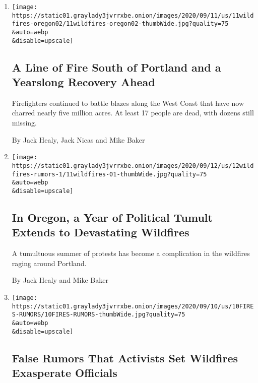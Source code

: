 \begin{enumerate}
\def\labelenumi{\arabic{enumi}.}
\item
  \href{/2020/09/11/us/fires-oregon-california-washington.html}{}

  \texttt{[image: https://static01.graylady3jvrrxbe.onion/images/2020/09/11/us/11wildfires-oregon02/11wildfires-oregon02-thumbWide.jpg?quality=75\\\&auto=webp\\\&disable=upscale]}

  \hypertarget{a-line-of-fire-south-of-portland-and-a-yearslong-recovery-ahead}{%
  \subsection{A Line of Fire South of Portland and a Yearslong Recovery
  Ahead}\label{a-line-of-fire-south-of-portland-and-a-yearslong-recovery-ahead}}

  Firefighters continued to battle blazes along the West Coast that have
  now charred nearly five million acres. At least 17 people are dead,
  with dozens still missing.

  By Jack Healy, Jack Nicas and Mike Baker
\item
  \href{/2020/09/11/us/fires-oregon-antifa-rumors.html}{}

  \texttt{[image: https://static01.graylady3jvrrxbe.onion/images/2020/09/12/us/12wildfires-rumors-1/11wildfires-01-thumbWide.jpg?quality=75\\\&auto=webp\\\&disable=upscale]}

  \hypertarget{in-oregon-a-year-of-political-tumult-extends-to-devastating-wildfires}{%
  \subsection{In Oregon, a Year of Political Tumult Extends to
  Devastating
  Wildfires}\label{in-oregon-a-year-of-political-tumult-extends-to-devastating-wildfires}}

  A tumultuous summer of protests has become a complication in the
  wildfires raging around Portland.

  By Jack Healy and Mike Baker
\item
  \href{/2020/09/10/us/antifa-wildfires.html}{}

  \texttt{[image: https://static01.graylady3jvrrxbe.onion/images/2020/09/10/us/10FIRES-RUMORS/10FIRES-RUMORS-thumbWide.jpg?quality=75\\\&auto=webp\\\&disable=upscale]}

  \hypertarget{false-rumors-that-activists-set-wildfires-exasperate-officials}{%
  \subsection{False Rumors That Activists Set Wildfires Exasperate
  Officials}\label{false-rumors-that-activists-set-wildfires-exasperate-officials}}


\end{enumerate}
